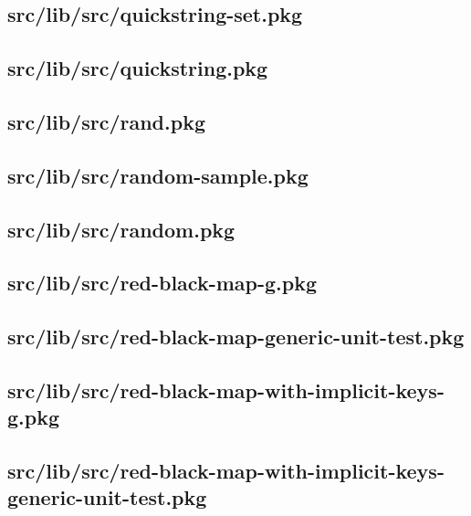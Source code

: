 \subsection{src/lib/src/quickstring-set.pkg}


\subsection{src/lib/src/quickstring.pkg}


\subsection{src/lib/src/rand.pkg}


\subsection{src/lib/src/random-sample.pkg}


\subsection{src/lib/src/random.pkg}


\subsection{src/lib/src/red-black-map-g.pkg}


\subsection{src/lib/src/red-black-map-generic-unit-test.pkg}


\subsection{src/lib/src/red-black-map-with-implicit-keys-g.pkg}


\subsection{src/lib/src/red-black-map-with-implicit-keys-generic-unit-test.pkg}


